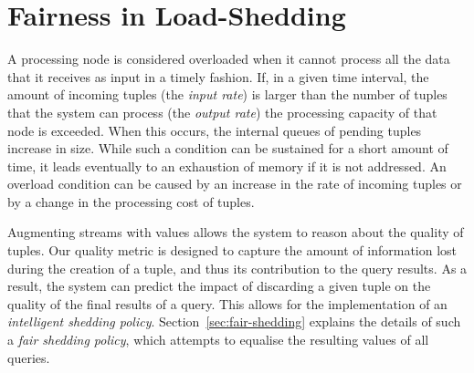 
\section{Fairness in \mbox{Load-Shedding}}
\label{sec:fls}

A processing node is considered overloaded when it cannot process all the data that it receives as input
in a timely fashion. If, in a given time interval, the amount of incoming tuples (\ie the \emph{input
rate}) is larger than the number of tuples that the system can process (\ie the \emph{output rate}) the
processing capacity of that node is exceeded. When this occurs, the internal queues of pending tuples
increase in size. While such a condition can be sustained for a short amount of time, it leads eventually
to an exhaustion of memory if it is not addressed.
An overload condition can be caused by an increase in the rate of incoming tuples or
by a change in the processing cost of tuples.

Augmenting streams with \sic values allows the system to reason about the quality of tuples. Our quality
metric is designed to capture the amount of information lost during the creation of a tuple, and thus its
contribution to the query results.
As a result, the system can predict the impact of discarding a given tuple on the quality of the final
results of a query. This allows for the implementation of an \emph{intelligent shedding policy}.
Section~\ref{sec:fair-shedding} explains the details of such a \emph{fair shedding policy}, which
attempts to equalise the resulting \sic values of all queries.

